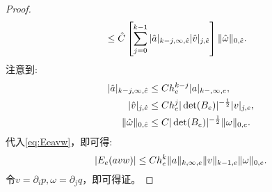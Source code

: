 \begin{proof}
\begin{equation}
\begin{aligned}
            &\le\hat{C}\left[\sum_{j=0}^{k-1}|\hat{a}|_{k-j,\infty,\hat{e}}|\hat{v}|_{j,\hat{e}}\right]\|\hat{\omega}\|_{0,\hat{e}}.
        \end{aligned}
    \end{equation}
    注意到:
    \begin{equation}
        \begin{aligned}
            |\hat{a}|_{k-j,\infty,\hat{e}}&\le Ch_{e}^{k-j}|a|_{k-,\infty,e},\\
            |\hat{v}|_{j,\hat{e}}&\le Ch_{e}^{j}|\det(B_{e})|^{-\frac{1}{2}}|v|_{j,e},\\
            \|\hat{\omega}\|_{0,\hat{e}}&\le C|\det(B_{e})|^{-\frac{1}{2}}\|\omega\|_{0,e}.
        \end{aligned}
    \end{equation}
    代入\eqref{eq:Eeavw}，即可得:
    \begin{equation}
        |E_{e}(avw)|\le Ch_{e}^{k}\|a\|_{k,\infty,e}\|v\|_{k-1,e}\|\omega\|_{0,e}.
    \end{equation}
    令$v=\partial_{i}p,\omega=\partial_{j}q$，即可得证。
\end{proof}
